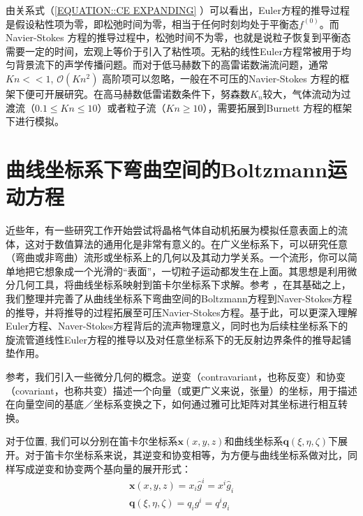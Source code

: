 \documentclass[LBMDerivation.tex]{subfiles}
\begin{document}
由关系式（\ref{EQUATION::CE EXPANDING} ）可以看出，Euler方程的推导过程是假设粘性项为零，即松弛时间为零，相当于任何时刻均处于平衡态$f^{(0)}$。而 Navier-Stokes 方程的推导过程中，松弛时间不为零，也就是说粒子恢复到平衡态需要一定的时间，宏观上等价于引入了粘性项。无粘的线性Euler方程常被用于均匀背景流下的声学传播问题。而对于低马赫数下的高雷诺数湍流问题，通常$Kn << 1$, $\mathcal{O}\left(K n^{2}\right)$ 高阶项可以忽略，一般在不可压的Navier-Stokes 方程的框架下便可开展研究。在高马赫数低雷诺数条件下，努森数$K_n$较大，气体流动为过渡流（$0.1\leq Kn\leq 10$）或者粒子流（$Kn\geq10$），需要拓展到Burnett 方程的框架下进行模拟。




%
%
%
%
\section{曲线坐标系下弯曲空间的Boltzmann运动方程}
%
%
近些年，有一些研究工作开始尝试将晶格气体自动机拓展为模拟任意表面上的流体，这对于数值算法的通用化是非常有意义的。在广义坐标系下，可以研究任意（弯曲或非弯曲）流形或坐标系上的几何以及其动力学关系。一个流形，你可以简单地把它想象成一个光滑的“表面”，一切粒子运动都发生在上面。其思想是利用微分几何工具，将曲线坐标系映射到笛卡尔坐标系下求解。参考 \cite{love2011boltzmann, mendoza2013flow,viggen2014lattice,ChenHudong2021LBM}，在其基础之上，我们整理并完善了从曲线坐标系下弯曲空间的Boltzmann方程到Naver-Stokes方程的推导，并将推导的过程拓展至可压Navier-Stokes方程。基于此，可以更深入理解Euler方程、Naver-Stokes方程背后的流声物理意义，同时也为后续柱坐标系下的旋流管道线性Euler方程的推导以及对任意坐标系下的无反射边界条件的推导起铺垫作用。
%
%




参考\cite{kajishima2016computational,nguyen2014tensor}，我们引入一些微分几何的概念。逆变（contravariant，也称反变）和协变（covariant，也称共变）描述一个向量（或更广义来说，张量）的坐标，用于描述在向量空间的基底／坐标系变换之下，如何通过雅可比矩阵对其坐标进行相互转换。

对于位置, 我们可以分别在笛卡尔坐标系$\boldsymbol{x}(x,y,z)$和曲线坐标系$\boldsymbol{q}(\xi,\eta,\zeta)$下展开。对于笛卡尔坐标系来说，其逆变和协变相等，为方便与曲线坐标系做对比，同样写成逆变和协变两个基向量的展开形式：
%
%
\begin{equation}
  \begin{aligned}
    \boldsymbol{x}(x,y,z)=x_{i} \widehat{g}^{i}=x^{i} \widehat{g}_{i} \\
    \boldsymbol{q}(\xi,\eta,\zeta)=q_{i} g^{i}=q^{i} g_{i}
  \end{aligned}
\end{equation}
\end{document}
